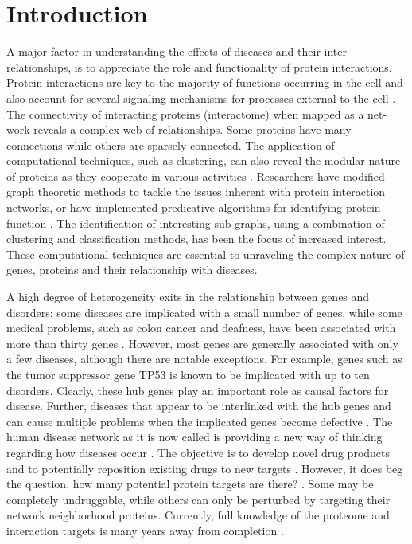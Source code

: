 \documentclass[a4paper,8pt,twocolumn,5p]{elsarticle}
\begin{document}
\section{Introduction}
A major factor in understanding the effects of diseases and their inter-relationships, is to appreciate the role and functionality of protein interactions. Protein interactions are key to the majority of functions occurring in the cell and also account for several signaling mechanisms for processes external to the cell \cite{Nabieva05}. The connectivity of interacting proteins (interactome) when mapped as a net-work reveals a complex web of relationships. Some proteins have many connections while others are sparsely connected. The application of computational techniques, such as clustering, can also reveal the modular nature of proteins as they cooperate in various activities \cite{McGarry2013}. Researchers have modified graph theoretic methods to tackle the issues inherent with protein interaction networks, or have implemented predicative algorithms for identifying protein function \cite{McGarry07a}. The identification of  interesting sub-graphs, using a combination of clustering and classification methods, has been the focus of increased interest. These computational techniques are essential to unraveling the complex nature of genes, proteins and their relationship with diseases.

 A high degree of heterogeneity exits in the relationship between genes and disorders: some diseases are implicated with a small number of genes, while some medical problems, such as colon cancer and deafness, have been associated
with more than thirty genes \cite{Menche2015}. However, most genes are generally associated with only a few diseases, although there are notable exceptions. For example, genes such as the tumor suppressor gene TP53 is known to be implicated with up to ten disorders. Clearly, these hub genes play an important role as causal factors for disease. Further, diseases that appear to be interlinked with the hub genes and can cause multiple problems when the implicated genes become defective \cite{Ghiassian2015}. The human disease network as it is now called is providing a new way of thinking regarding how diseases occur  \cite{Barrenas2009}. The objective is to develop novel drug products and to potentially reposition existing drugs to new targets  \cite{Yue2017}.  However, it does beg the question, how many potential protein targets are there? \cite{Overington2006}. Some may be completely undruggable, while others can only be perturbed by targeting their network neighborhood proteins. Currently, full knowledge of the proteome and interaction targets is many years away from completion  \cite{Barabasi2011}.
\end{document}
